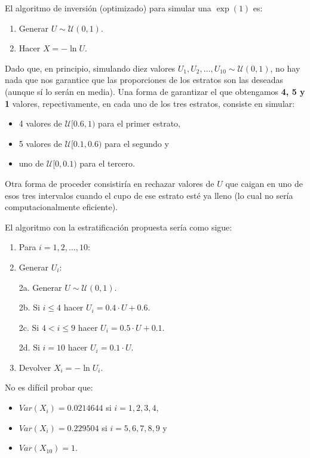 \documentclass[
]{book}
\theoremstyle{break}
\theoremstyle{definition}
\theoremstyle{definition}
\theoremstyle{definition}
\theoremstyle{definition}
\theoremstyle{remark}
\begin{document}
El algoritmo de inversión (optimizado) para simular una \(\exp\left(1\right)\) es:

\begin{enumerate}
\def\labelenumi{\arabic{enumi}.}
\item
  Generar \(U\sim \mathcal{U}\left( 0,1\right)\).
\item
  Hacer \(X=-\ln U\).
\end{enumerate}

Dado que, en principio, simulando diez valores \(U_{1},U_{2},\ldots,U_{10}\sim \mathcal{U}\left( 0,1\right)\), no hay nada que nos garantice que las proporciones de los estratos son las deseadas (aunque sí lo serán en media).
Una forma de garantizar el que obtengamos \textbf{4, 5 y 1} valores, repectivamente, en cada uno de los tres estratos, consiste en simular:

\begin{itemize}
\item
  4 valores de \(\mathcal{U}[0.6,1)\) para el primer estrato,
\item
  5 valores de \(\mathcal{U}[0.1,0.6)\) para el segundo y
\item
  uno de \(\mathcal{U}[0,0.1)\) para el tercero.
\end{itemize}

Otra forma de proceder consistiría en rechazar valores de \(U\) que caigan en uno de esos tres intervalos cuando el cupo de ese estrato esté ya lleno (lo cual no sería computacionalmente eficiente).

El algoritmo con la estratificación propuesta sería como sigue:

\begin{enumerate}
\def\labelenumi{\arabic{enumi}.}
\item
  Para \(i=1,2,\ldots, 10\):
\item
  Generar \(U_{i}\):

  2a. Generar \(U\sim \mathcal{U}\left( 0,1\right)\).

  2b. Si \(i\leq4\) hacer \(U_{i} = 0.4 \cdot U + 0.6\).

  2c. Si \(4<i\leq9\) hacer \(U_{i} = 0.5 \cdot U + 0.1\).

  2d. Si \(i=10\) hacer \(U_{i} = 0.1 \cdot U\).
\item
  Devolver \(X_{i}=-\ln U_{i}\).
\end{enumerate}

No es difícil probar que:

\begin{itemize}
\item
  \(Var\left( X_{i}\right) = 0.0214644\) si \(i=1,2,3,4\),
\item
  \(Var\left( X_{i}\right) = 0.229504\) si \(i=5,6,7,8,9\) y
\item
  \(Var\left( X_{10}\right) = 1\).
\end{itemize}
\end{document}
